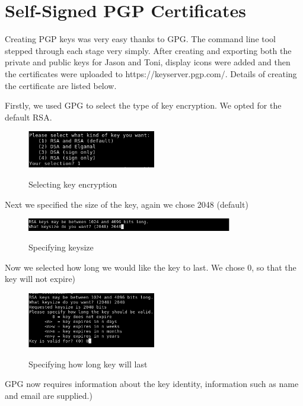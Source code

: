 \section{Self-Signed PGP Certificates}

Creating PGP keys was very easy thanks to GPG. The command line tool stepped through each stage very simply. After creating and exporting both the private and public keys for Jason and Toni, display icons were added and then the certificates were uploaded to https://keyserver.pgp.com/. Details of creating the certificate are listed below. 

\noindent Firstly, we used GPG to select the type of key encryption. We opted for the default RSA.
\begin{figure}[hbt!]
	\centering
      \includegraphics[width=0.5\textwidth]{imgs/pgp/1} \\
	\caption{Selecting key encryption}
	\label{fig:selectkey}
    \noindent\makebox[\linewidth]{}
\end{figure}

\noindent Next we specified the size of the key, again we chose 2048 (default)

\begin{figure}[hbt!]
	\centering
      \includegraphics[width=0.8\textwidth]{imgs/pgp/2} \\
	\caption{Specifying keysize}
	\label{fig:specifiyingkeysize}
    \noindent\makebox[\linewidth]{}
\end{figure}

\noindent Now we selected how long we would like the key to last. We chose 0, so that the key will not expire)

\begin{figure}[hbt!]
	\centering
      \includegraphics[width=0.5\textwidth]{imgs/pgp/3} \\
	\caption{Specifying how long key will last}
	\label{fig:specifiyingkeysize}
    \noindent\makebox[\linewidth]{}
\end{figure}
\newpage
\noindent GPG now requires information about the key identity, information such as name and email are supplied.)

